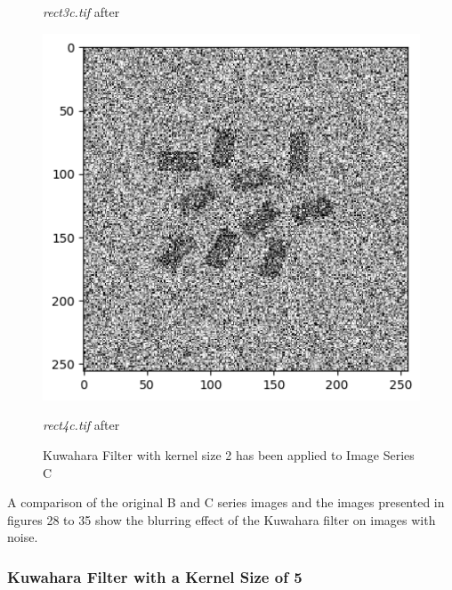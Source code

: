 \documentclass[runningheads]{llncs}
\begin{document}
\begin{figure}[h!]
\begin{minipage}[h]{0.47\linewidth}
\begin{center}
\caption{\emph{rect3c.tif} after}
\label{kc3-Kuwahara and Kernel 2}
\end{center}
\end{minipage}
\hfill
\begin{minipage}[h]{0.47\linewidth}
\begin{center}
\includegraphics[width=1\linewidth]{Report/Result_Images/image_kc4.png} 
\caption{\emph{rect4c.tif} after}
\label{kc4-Kuwahara and Kernel 2}
\end{center}
\end{minipage}
\caption*{Kuwahara Filter with kernel size 2 has been applied to Image Series C}
\label{kc1-4 Kuwahara2}
\end{figure}

A comparison of the original B and C series images and the images presented in figures 28 to 35 show the blurring effect of the Kuwahara filter on images with noise.


\newpage
\subsubsection*{Kuwahara Filter with a Kernel Size of 5}
\end{document}
